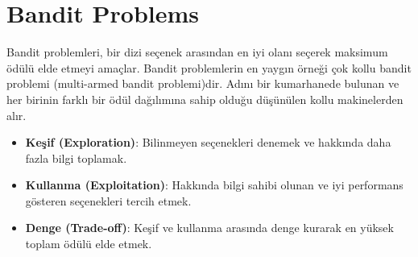 \section{Bandit Problems}

Bandit problemleri, bir dizi seçenek arasından en iyi olanı seçerek maksimum ödülü elde etmeyi amaçlar. Bandit problemlerin en yaygın örneği çok kollu bandit problemi (multi-armed bandit problemi)dir. Adını bir kumarhanede bulunan ve her birinin farklı bir ödül dağılımına sahip olduğu düşünülen kollu makinelerden alır.

\begin{itemize}
	\item \textbf{Keşif (Exploration)}: Bilinmeyen seçenekleri denemek ve hakkında daha fazla bilgi toplamak.
	\item \textbf{Kullanma (Exploitation)}: Hakkında bilgi sahibi olunan ve iyi performans gösteren seçenekleri tercih etmek.
	\item \textbf{Denge (Trade-off)}: Keşif ve kullanma arasında denge kurarak en yüksek toplam ödülü elde etmek.
\end{itemize}

\newpage